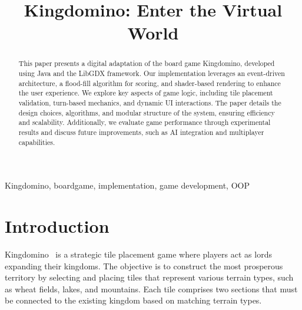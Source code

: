 \documentclass[conference]{IEEEtran}
\begin{document}
\title{Kingdomino: Enter the Virtual World}

\author{
    \and
}

\maketitle

\begin{abstract}
    This paper presents a digital adaptation of the board game Kingdomino,
    developed using Java and the LibGDX framework. Our implementation leverages an
    event-driven architecture, a flood-fill algorithm for scoring, and shader-based
    rendering to enhance the user experience. We explore key aspects of game logic,
    including tile placement validation, turn-based mechanics, and dynamic UI
    interactions. The paper details the design choices, algorithms, and modular
    structure of the system, ensuring efficiency and scalability. Additionally, we
    evaluate game performance through experimental results and discuss future
    improvements, such as AI integration and multiplayer capabilities.
\end{abstract}

\begin{IEEEkeywords}
    Kingdomino, boardgame, implementation, game development, OOP
\end{IEEEkeywords}

\section{Introduction}

Kingdomino~\cite{wiki:kingdomino} is a strategic tile placement game where
players act as lords expanding their kingdoms. The objective is to construct
the most prosperous territory by selecting and placing tiles that represent
various terrain types, such as wheat fields, lakes, and mountains. Each tile
comprises two sections that must be connected to the existing kingdom based on
matching terrain types.
\end{document}
